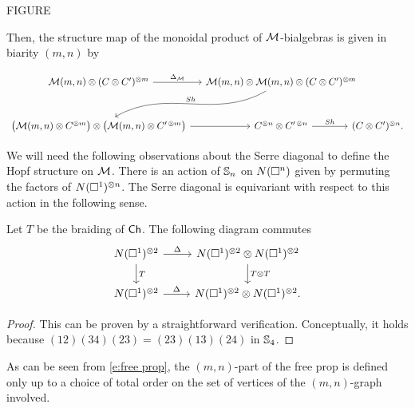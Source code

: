 FIGURE

Then, the structure map of the monoidal product of $\M$-bialgebras is given in biarity $(m,n)$ by 

\begin{equation*}
\begin{tikzcd} [column sep = small, row sep=large]
\M(m,n) \otimes (C \otimes C^\prime)^{\otimes m} \arrow[r, "\Delta_\M"] & \M(m,n) \otimes \M(m,n) \otimes (C \otimes C^\prime)^{\otimes m} \arrow[dl, out=-150, in=30, "Sh"'] &[-25pt] \\
\big(\M(m,n) \otimes C^{\otimes m}\big) \otimes \big(\M(m,n) \otimes C^{\prime\, \otimes m}\big) \arrow[r] & 
C^{\otimes n} \otimes C^{\prime\, \otimes n} \arrow[r, "Sh"] &[-25pt]
(C \otimes C^\prime)^{\otimes n}.
\end{tikzcd}
\end{equation*}

We will need the following observations about the Serre diagonal to define the Hopf structure on $\M$.
There is an action of $\S_n$ on $\cchains(\square^n)$ given by permuting the factors of $\cchains(\square^1)^{\otimes n}$.
The Serre diagonal is equivariant with respect to this action in the following sense.

\begin{lemma} \label{l:serre diagonal invariant}
	Let $T$ be the braiding of $\Ch$.
	The following diagram commutes
	\begin{equation*}
	\begin{tikzcd}
	\cchains(\square^1)^{\otimes 2} \arrow[r, "\Delta"] \arrow[d, "T"] &
	\cchains(\square^1)^{\otimes 2} \otimes \cchains(\square^1)^{\otimes 2} \arrow[d, "T \otimes T"] \\
	\cchains(\square^1)^{\otimes 2} \arrow[r, "\Delta"] &
	\cchains(\square^1)^{\otimes 2} \otimes \cchains(\square^1)^{\otimes 2}.
	\end{tikzcd}
	\end{equation*}
\end{lemma}

\begin{proof}
	This can be proven by a straightforward verification. Conceptually, it holds because $(12)(34)(23) = (23)(13)(24)$ in $\S_4$.
\end{proof}

As can be seen from \eqref{e:free prop}, the $(m,n)$-part of the free prop is defined only up to a choice of total order on the set of vertices of the $(m,n)$-graph involved.

